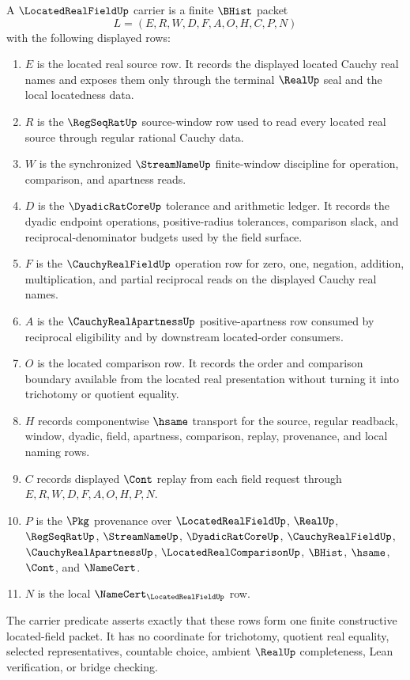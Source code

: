 \begin{definition}
\label{def:located-real-field-carrier}
A $\LocatedRealFieldUp$ carrier is a finite $\BHist$ packet
$$
L=(E,R,W,D,F,A,O,H,C,P,N)
$$
with the following displayed rows:
\begin{enumerate}
\item $E$ is the located real source row. It records the displayed located Cauchy real names and exposes them only through the terminal $\RealUp$ seal and the local locatedness data.
\item $R$ is the $\RegSeqRatUp$ source-window row used to read every located real source through regular rational Cauchy data.
\item $W$ is the synchronized $\StreamNameUp$ finite-window discipline for operation, comparison, and apartness reads.
\item $D$ is the $\DyadicRatCoreUp$ tolerance and arithmetic ledger. It records the dyadic endpoint operations, positive-radius tolerances, comparison slack, and reciprocal-denominator budgets used by the field surface.
\item $F$ is the $\CauchyRealFieldUp$ operation row for zero, one, negation, addition, multiplication, and partial reciprocal reads on the displayed Cauchy real names.
\item $A$ is the $\CauchyRealApartnessUp$ positive-apartness row consumed by reciprocal eligibility and by downstream located-order consumers.
\item $O$ is the located comparison row. It records the order and comparison boundary available from the located real presentation without turning it into trichotomy or quotient equality.
\item $H$ records componentwise $\hsame$ transport for the source, regular readback, window, dyadic, field, apartness, comparison, replay, provenance, and local naming rows.
\item $C$ records displayed $\Cont$ replay from each field request through $E,R,W,D,F,A,O,H,P,N$.
\item $P$ is the $\Pkg$ provenance over $\LocatedRealFieldUp$, $\RealUp$, $\RegSeqRatUp$, $\StreamNameUp$, $\DyadicRatCoreUp$, $\CauchyRealFieldUp$, $\CauchyRealApartnessUp$, $\LocatedRealComparisonUp$, $\BHist$, $\hsame$, $\Cont$, and $\NameCert$.
\item $N$ is the local $\NameCert_{\LocatedRealFieldUp}$ row.
\end{enumerate}
The carrier predicate asserts exactly that these rows form one finite constructive located-field packet. It has no coordinate for trichotomy, quotient real equality, selected representatives, countable choice, ambient $\RealUp$ completeness, Lean verification, or bridge checking.
\end{definition}

